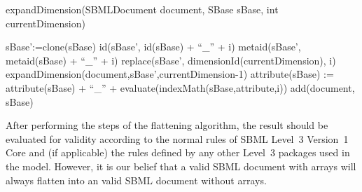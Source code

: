 \begin{algorithm}[ht]
\label{expandDimension}
  \caption{expandDimension(SBMLDocument document, SBase sBase, int currentDimension)}
       {
                {
                        sBase':=clone(sBase)\;
                        id(sBase', id(sBase) + ``\_'' + i)\;
                        metaid(sBase', metaid(sBase) + ``\_'' + i)\;
                        replace(sBase', dimensionId(currentDimension), i)\;
                        expandDimension(document,sBase',currentDimension-1)\;
               }
     }
     \Else
     {
                {
                        {
                           attribute(sBase) := attribute(sBase) + ``\_'' + evaluate(indexMath(sBase,attribute,i))\;
                        }
                }
                add(document, sBase)\;
     }
\end{algorithm}

After performing the steps of the flattening algorithm, the result should be evaluated for validity according to the normal rules of SBML Level~3 Version~1 Core and (if applicable) the rules defined by any other Level~3 packages used in the model.  However, it is our belief that a valid SBML document with arrays will always flatten into an valid SBML document without arrays.



